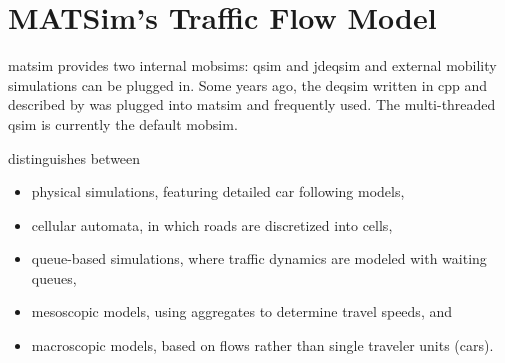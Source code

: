 \section{MATSim's Traffic Flow Model}
\label{sec:trafficflowmodel}
\gls{matsim} provides two internal \glspl{mobsim}: \gls{qsim} and \gls{jdeqsim} and external mobility simulations can be plugged in. Some years ago, the \gls{deqsim} written in \gls{cpp} and described by \citet[][]{Charypar_PhDThesis_2008,%
CharyparAxhausenEtAl2007Event-DrivenQueueBasedTraffic,%
CharyparAxhausenEtAl2007event-drivenparallelqueue-based,%
CharyparEtAl_TRB_2009}
was plugged into \gls{matsim} and frequently used. The multi-threaded \gls{qsim} is currently the default \gls{mobsim}.

\citet[][]{CharyparEtAl_TRB_2009} distinguishes between 
\begin{itemize}\styleItemize
\item physical simulations, featuring detailed car following models, %
\item cellular automata, in which roads are discretized into cells,
\item queue-based simulations, where traffic dynamics are modeled with waiting queues,
\item mesoscopic models, using aggregates to determine travel speeds, and
\item macroscopic models, based on flows rather than single traveler units (\eg cars).
\end{itemize}


